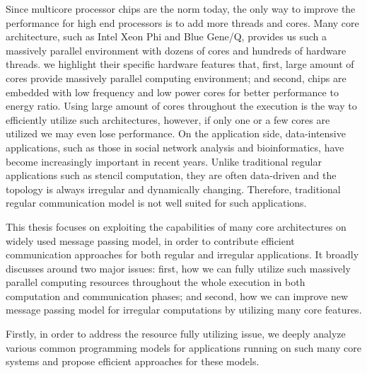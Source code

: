 Since multicore processor chips are the norm today, the only way to 
improve the performance for high end processors is to add more threads 
and cores. Many core architecture, such as Intel Xeon Phi and Blue Gene/Q, 
provides us such a massively parallel environment with dozens of cores and
hundreds of hardware threads. we highlight their specific hardware features 
that, first, large amount of cores provide massively parallel computing 
environment; and second, chips are embedded with low frequency and low power
cores for better performance to energy ratio. Using large amount of cores
throughout the execution is the way to efficiently utilize such architectures, 
however, if only one or a few cores are utilized we may even lose performance. 
On the application side, data-intensive applications, such as those in social 
network analysis and bioinformatics, have become increasingly important in 
recent years. Unlike traditional regular applications such as stencil 
computation, they are often data-driven and the topology is always irregular 
and dynamically changing. Therefore, traditional regular communication model 
is not well suited for such applications.

This thesis focuses on exploiting the capabilities of many core 
architectures on widely used message passing model, in order to contribute
efficient communication approaches for both regular and irregular applications. 
It broadly discusses around two major issues: first, how we can fully utilize
such massively parallel computing resources throughout the whole execution
in both computation and communication phases; and second, how we can improve 
new message passing model for irregular computations by utilizing many 
core features. 

Firstly, in order to address the resource fully utilizing issue, we deeply 
analyze various common programming models for applications running on such 
many core systems and propose efficient approaches for these models. 

